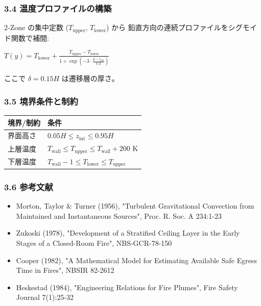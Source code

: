 \documentclass[a4paper,11pt]{article}
\begin{document}
\subsubsection{3.4 温度プロファイルの構築}

2-Zone の集中定数 ($T_{\text{upper}}$, $T_{\text{lower}}$) から
鉛直方向の連続プロファイルをシグモイド関数で補間:

$
T(y) = T_{\text{lower}} + \frac{T_{\text{upper}} - T_{\text{lower}}}{1 + \exp\left(-3 \cdot \frac{y - z_{\text{int}}}{\delta / 2}\right)}
$

ここで $\delta = 0.15 H$ は遷移層の厚さ。

\subsubsection{3.5 境界条件と制約}

{\small
\noindent
\begin{tabularx}{\textwidth}{|L|L|}
\hline
\textbf{境界/制約} & \textbf{条件} \\
\hline
界面高さ & $0.05 H \le z_{\text{int}} \le 0.95 H$ \\
\hline
上層温度 & $T_{\text{wall}} \le T_{\text{upper}} \le T_{\text{wall}} + 200$ K \\
\hline
下層温度 & $T_{\text{wall}} - 1 \le T_{\text{lower}} \le T_{\text{upper}}$ \\
\hline
\end{tabularx}
}


\subsubsection{3.6 参考文献}

\begin{itemize} \item Morton, Taylor \& Turner (1956), "Turbulent Gravitational Convection from Maintained and Instantaneous Sources", Proc. R. Soc. A 234:1-23 \end{itemize}
\begin{itemize} \item Zukoski (1978), "Development of a Stratified Ceiling Layer in the Early Stages of a Closed-Room Fire", NBS-GCR-78-150 \end{itemize}
\begin{itemize} \item Cooper (1982), "A Mathematical Model for Estimating Available Safe Egress Time in Fires", NBSIR 82-2612 \end{itemize}
\begin{itemize} \item Heskestad (1984), "Engineering Relations for Fire Plumes", Fire Safety Journal 7(1):25-32 \end{itemize}
\end{document}
